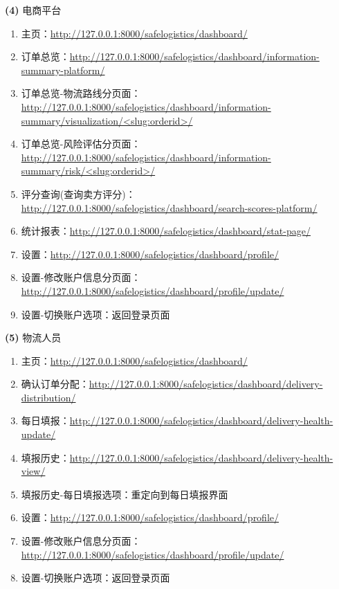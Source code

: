 \documentclass[12pt]{article}
\begin{document}
\noindent \textbf{(4)} 电商平台 \par
\begin{enumerate}
	\item 主页：\url{http://127.0.0.1:8000/safelogistics/dashboard/} 
	\item 订单总览：\url{http://127.0.0.1:8000/safelogistics/dashboard/information-summary-platform/}
	\item 订单总览-物流路线分页面：\url{http://127.0.0.1:8000/safelogistics/dashboard/information-summary/visualization/<slug:orderid>/}
	\item 订单总览-风险评估分页面：\url{http://127.0.0.1:8000/safelogistics/dashboard/information-summary/risk/<slug:orderid>/}
	\item 评分查询(查询卖方评分)：\url{http://127.0.0.1:8000/safelogistics/dashboard/search-scores-platform/}
	\item 统计报表：\url{http://127.0.0.1:8000/safelogistics/dashboard/stat-page/}
	\item 设置：\url{http://127.0.0.1:8000/safelogistics/dashboard/profile/}
	\item 设置-修改账户信息分页面：\url{http://127.0.0.1:8000/safelogistics/dashboard/profile/update/}
	\item 设置-切换账户选项：返回登录页面
\end{enumerate}

\noindent \textbf{(5)} 物流人员 \par
\begin{enumerate}
	\item 主页：\url{http://127.0.0.1:8000/safelogistics/dashboard/} 
	\item 确认订单分配：\url{http://127.0.0.1:8000/safelogistics/dashboard/delivery-distribution/}
	\item 每日填报：\url{http://127.0.0.1:8000/safelogistics/dashboard/delivery-health-update/}
	\item 填报历史：\url{http://127.0.0.1:8000/safelogistics/dashboard/delivery-health-view/}
	\item 填报历史-每日填报选项：重定向到每日填报界面
	\item 设置：\url{http://127.0.0.1:8000/safelogistics/dashboard/profile/}
	\item 设置-修改账户信息分页面：\url{http://127.0.0.1:8000/safelogistics/dashboard/profile/update/}
	\item 设置-切换账户选项：返回登录页面	
\end{enumerate}
\end{document}

